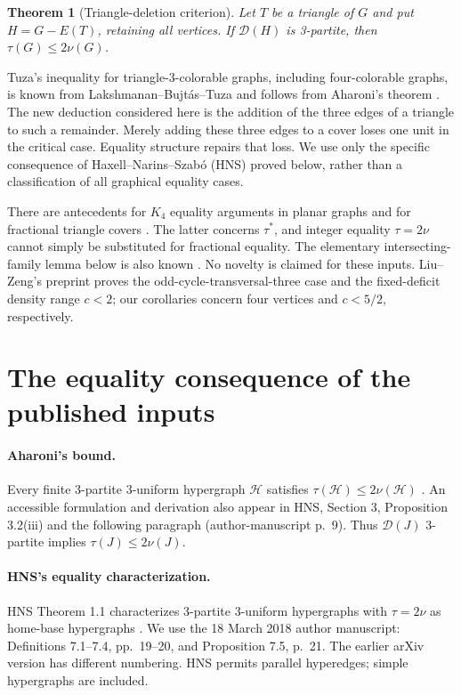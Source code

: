 \documentclass[11pt]{article}
\newtheorem{theorem}{Theorem}[section]
\newcommand{\D}{\mathcal D}
\begin{document}
\begin{theorem}[Triangle-deletion criterion]\label{thm:main}
Let $T$ be a triangle of $G$ and put $H=G-E(T)$, retaining all vertices.
If $\D(H)$ is 3-partite, then $\tau(G)\le2\nu(G)$.
\end{theorem}

Tuza's inequality for triangle-3-colorable graphs, including four-colorable
graphs, is known from Lakshmanan--Bujt\'as--Tuza \cite{LBT} and follows from
Aharoni's theorem \cite{Aharoni}. The new deduction considered here is the
addition of the three edges of a triangle to such a remainder. Merely
adding these three edges to a cover loses one unit in the critical case.
Equality structure repairs that loss. We use only the specific consequence
of Haxell--Narins--Szab\'o (HNS) \cite{HNS} proved below, rather than a
classification of all graphical equality cases.

There are antecedents for $K_4$ equality arguments in planar graphs
\cite{CHM} and for fractional triangle covers \cite{HKT}. The latter concerns
$\tau^*$, and integer equality $\tau=2\nu$ cannot simply be substituted for
fractional equality. The elementary intersecting-family lemma below is also
known \cite{AZ}. No novelty is claimed for these inputs. Liu--Zeng's
preprint \cite{LZ} proves the odd-cycle-transversal-three case and the
fixed-deficit density range $c<2$; our corollaries concern four vertices and
$c<5/2$, respectively.

\section{The equality consequence of the published inputs}
\paragraph{Aharoni's bound.}
Every finite 3-partite 3-uniform hypergraph $\mathcal H$ satisfies
$\tau(\mathcal H)\le2\nu(\mathcal H)$ \cite{Aharoni}.
An accessible formulation and derivation also appear in HNS, Section 3,
Proposition 3.2(iii) and the following paragraph (author-manuscript p.~9).
Thus $\D(J)$ 3-partite implies $\tau(J)\le2\nu(J)$.

\paragraph{HNS's equality characterization.}
HNS Theorem 1.1 characterizes 3-partite 3-uniform hypergraphs with
$\tau=2\nu$ as home-base hypergraphs \cite{HNS}. We use the 18 March 2018
author manuscript: Definitions 7.1--7.4, pp.~19--20, and Proposition 7.5,
p.~21. The earlier arXiv version has different numbering. HNS permits
parallel hyperedges; simple hypergraphs are included.
\end{document}
